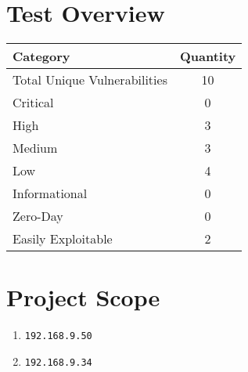 \documentclass[a4paper,12pt]{article}
\begin{document}
\section{Test Overview}
\begin{table}[ht]
    \centering
    \begin{tabular}{lc}
        \toprule
        \rowcolor{gray!20} \textbf{Category} & \textbf{Quantity} \\
        \midrule
        Total Unique Vulnerabilities & 10 \\
        Critical & 0 \\
        High & 3 \\
        Medium & 3 \\
        Low & 4 \\
        Informational & 0 \\ \hline
        Zero-Day & 0 \\
        Easily Exploitable & 2 \\
        \bottomrule
    \end{tabular}
\end{table}

\section{Project Scope}
\begin{enumerate}
    \item \texttt{192.168.9.50}
    \item \texttt{192.168.9.34}
\end{enumerate}
\end{document}
